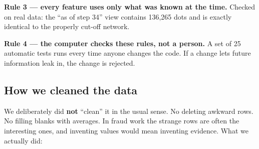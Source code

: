 \documentclass[11pt,a4paper]{article}
\begin{document}
\begin{keybox}
\textbf{Rule 3 --- every feature uses only what was known at the time.}
Checked on real data: the ``as of step 34'' view contains 136{,}265 dots and is
exactly identical to the properly cut-off network.
\end{keybox}

\begin{keybox}
\textbf{Rule 4 --- the computer checks these rules, not a person.}
A set of 25 automatic tests runs every time anyone changes the code. If a change
lets future information leak in, the change is rejected.
\end{keybox}

\subsection{How we cleaned the data}

We deliberately did \textbf{not} ``clean'' it in the usual sense. No deleting
awkward rows. No filling blanks with averages. In fraud work the strange rows are
often the interesting ones, and inventing values would mean inventing evidence.
What we actually did:
\end{document}
